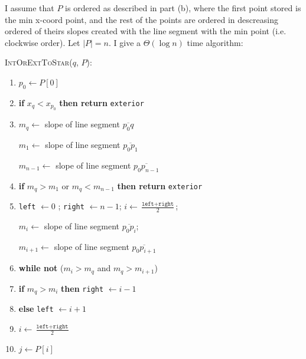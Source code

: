 \documentclass [12pt]{article}
\begin{document}
\begin{enumerate}[label=(\alph*)]
            \pagebreak

            I assume that $P$ is ordered as described in part (b), where the first point stored is the min x-coord point, and the rest of the points are ordered in descreasing ordered of theirs slopes created with the line segment with the min point (i.e. clockwise order). Let $|P| = n$. I give a $\Theta(\log n)$ time algorithm:

        \cbstart
            \textsc{IntOrExtToStar($q$, $P$)}:
            \begin{enumerate}[label=\arabic*.]
                \item $p_0 \leftarrow P[0]$
                \item \textbf{if} $x_q < x_{p_0}$ \textbf{then return} \texttt{exterior}
                \item $m_q \leftarrow$ slope of line segment $\overline{p_0 q}$

                $m_1 \leftarrow$ slope of line segment $\overline{p_0 p_1}$

                $m_{n-1} \leftarrow$ slope of line segment $\overline{p_0 p_{n - 1}}$
                
                \item \textbf{if} $m_q > m_1$ or $m_q < m_{n-1}$ \textbf{then return} \texttt{exterior}
                
                \item \texttt{left} $\leftarrow 0$ ; \texttt{right} $\leftarrow n - 1$; $i \leftarrow \frac{\texttt{left} + \texttt{right}}{2}$; 
                
                    $m_i \leftarrow$ slope of line segment $\overline{p_0 p_{i}}$; 
                    
                    $m_{i+1} \leftarrow$ slope of line segment $\overline{p_0 p_{i+1}}$
                
                \item \textbf{while not} ($m_{i} > m_{q}$ and $m_{q} > m_{i+1}$)
                \item \hspace{1cm} \textbf{if} $m_q > m_i$ \textbf{then} \texttt{right} $\leftarrow i - 1$
                \item \hspace{1cm} \textbf{else} \texttt{left} $\leftarrow i + 1$
                \item \hspace{1cm} $i \leftarrow \frac{\texttt{left} + \texttt{right}}{2}$
                \item $j\leftarrow P[i]$
                

\end{enumerate}
\end{enumerate}
\end{document}
